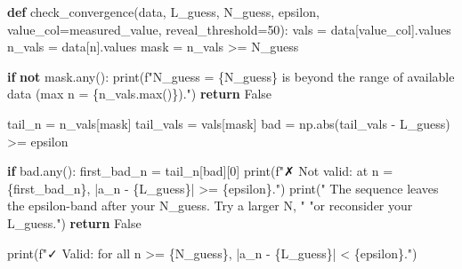 \documentclass[
  letterpaper,
  DIV=11,
  numbers=noendperiod]{scrreprt}
\newenvironment{Shaded}{\begin{snugshade}}{\end{snugshade}}
\newcommand{\BuiltInTok}[1]{\textcolor[rgb]{0.00,0.23,0.31}{#1}}
\newcommand{\ControlFlowTok}[1]{\textcolor[rgb]{0.00,0.23,0.31}{\textbf{#1}}}
\newcommand{\DecValTok}[1]{\textcolor[rgb]{0.68,0.00,0.00}{#1}}
\newcommand{\KeywordTok}[1]{\textcolor[rgb]{0.00,0.23,0.31}{\textbf{#1}}}
\newcommand{\NormalTok}[1]{\textcolor[rgb]{0.00,0.23,0.31}{#1}}
\newcommand{\OperatorTok}[1]{\textcolor[rgb]{0.37,0.37,0.37}{#1}}
\newcommand{\SpecialCharTok}[1]{\textcolor[rgb]{0.37,0.37,0.37}{#1}}
\newcommand{\SpecialStringTok}[1]{\textcolor[rgb]{0.13,0.47,0.30}{#1}}
\newcommand{\StringTok}[1]{\textcolor[rgb]{0.13,0.47,0.30}{#1}}
\newcommand{\VariableTok}[1]{\textcolor[rgb]{0.07,0.07,0.07}{#1}}
\theoremstyle{plain}
\theoremstyle{plain}
\theoremstyle{definition}
\theoremstyle{definition}
\theoremstyle{definition}
\theoremstyle{plain}
\theoremstyle{plain}
\theoremstyle{remark}
\begin{document}
\begin{Shaded}
\begin{Highlighting}[]
\KeywordTok{def}\NormalTok{ check\_convergence(data, L\_guess, N\_guess, epsilon, value\_col}\OperatorTok{=}\StringTok{\textquotesingle{}measured\_value\textquotesingle{}}\NormalTok{, reveal\_threshold}\OperatorTok{=}\DecValTok{50}\NormalTok{):}
\NormalTok{    vals }\OperatorTok{=}\NormalTok{ data[value\_col].values}
\NormalTok{    n\_vals }\OperatorTok{=}\NormalTok{ data[}\StringTok{\textquotesingle{}n\textquotesingle{}}\NormalTok{].values}
\NormalTok{    mask }\OperatorTok{=}\NormalTok{ n\_vals }\OperatorTok{\textgreater{}=}\NormalTok{ N\_guess}

    \ControlFlowTok{if} \KeywordTok{not}\NormalTok{ mask.}\BuiltInTok{any}\NormalTok{():}
        \BuiltInTok{print}\NormalTok{(}\SpecialStringTok{f"N\_guess = }\SpecialCharTok{\{}\NormalTok{N\_guess}\SpecialCharTok{\}}\SpecialStringTok{ is beyond the range of available data (max n = }\SpecialCharTok{\{}\NormalTok{n\_vals}\SpecialCharTok{.}\BuiltInTok{max}\NormalTok{()}\SpecialCharTok{\}}\SpecialStringTok{)."}\NormalTok{)}
        \ControlFlowTok{return} \VariableTok{False}

\NormalTok{    tail\_n }\OperatorTok{=}\NormalTok{ n\_vals[mask]}
\NormalTok{    tail\_vals }\OperatorTok{=}\NormalTok{ vals[mask]}
\NormalTok{    bad }\OperatorTok{=}\NormalTok{ np.}\BuiltInTok{abs}\NormalTok{(tail\_vals }\OperatorTok{{-}}\NormalTok{ L\_guess) }\OperatorTok{\textgreater{}=}\NormalTok{ epsilon}

    \ControlFlowTok{if}\NormalTok{ bad.}\BuiltInTok{any}\NormalTok{():}
\NormalTok{        first\_bad\_n }\OperatorTok{=}\NormalTok{ tail\_n[bad][}\DecValTok{0}\NormalTok{]}
        \BuiltInTok{print}\NormalTok{(}\SpecialStringTok{f"✗ Not valid: at n = }\SpecialCharTok{\{}\NormalTok{first\_bad\_n}\SpecialCharTok{\}}\SpecialStringTok{, |a\_n {-} }\SpecialCharTok{\{}\NormalTok{L\_guess}\SpecialCharTok{\}}\SpecialStringTok{| \textgreater{}= }\SpecialCharTok{\{}\NormalTok{epsilon}\SpecialCharTok{\}}\SpecialStringTok{."}\NormalTok{)}
        \BuiltInTok{print}\NormalTok{(}\StringTok{"  The sequence leaves the epsilon{-}band after your N\_guess. Try a larger N, "}
              \StringTok{"or reconsider your L\_guess."}\NormalTok{)}
        \ControlFlowTok{return} \VariableTok{False}

    \BuiltInTok{print}\NormalTok{(}\SpecialStringTok{f"✓ Valid: for all n \textgreater{}= }\SpecialCharTok{\{}\NormalTok{N\_guess}\SpecialCharTok{\}}\SpecialStringTok{, |a\_n {-} }\SpecialCharTok{\{}\NormalTok{L\_guess}\SpecialCharTok{\}}\SpecialStringTok{| \textless{} }\SpecialCharTok{\{}\NormalTok{epsilon}\SpecialCharTok{\}}\SpecialStringTok{."}\NormalTok{)}


\end{Highlighting}
\end{Shaded}
\end{document}
